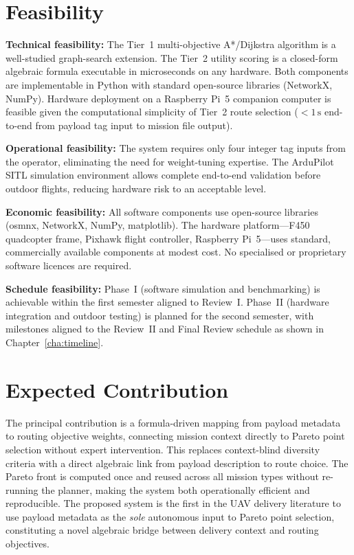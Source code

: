 \documentclass{ssnreview}
\begin{document}
\section{Feasibility}

\textbf{Technical feasibility:} The Tier~1 multi-objective A*/Dijkstra algorithm is a
well-studied graph-search extension. The Tier~2 utility scoring is a closed-form
algebraic formula executable in microseconds on any hardware. Both components are
implementable in Python with standard open-source libraries (NetworkX, NumPy). Hardware
deployment on a Raspberry Pi~5 companion computer is feasible given the computational
simplicity of Tier~2 route selection ($< 1\,\mathrm{s}$ end-to-end from payload tag
input to mission file output).

\textbf{Operational feasibility:} The system requires only four integer tag inputs from
the operator, eliminating the need for weight-tuning expertise. The ArduPilot
SITL simulation environment allows complete end-to-end validation before outdoor
flights, reducing hardware risk to an acceptable level.

\textbf{Economic feasibility:} All software components use open-source libraries
(osmnx, NetworkX, NumPy, matplotlib). The hardware platform---F450 quadcopter frame,
Pixhawk flight controller, Raspberry Pi~5---uses standard, commercially available
components at modest cost. No specialised or proprietary software licences are required.

\textbf{Schedule feasibility:} Phase~I (software simulation and benchmarking) is
achievable within the first semester aligned to Review~I. Phase~II (hardware integration
and outdoor testing) is planned for the second semester, with milestones aligned to the
Review~II and Final Review schedule as shown in Chapter~\ref{cha:timeline}.

\section{Expected Contribution}

The principal contribution is a formula-driven mapping from payload metadata to routing
objective weights, connecting mission context directly to Pareto point selection without
expert intervention. This replaces context-blind diversity criteria with a direct
algebraic link from payload description to route choice. The Pareto front is computed
once and reused across all mission types without re-running the planner, making the
system both operationally efficient and reproducible. The proposed system is the first in
the UAV delivery literature to use payload metadata as the \textit{sole} autonomous input
to Pareto point selection, constituting a novel algebraic bridge between delivery context
and routing objectives.
\end{document}

